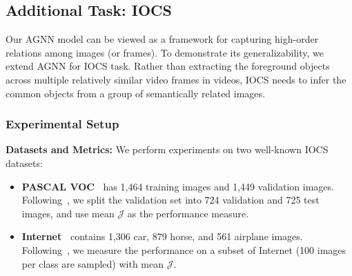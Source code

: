 \documentclass[10pt,twocolumn,letterpaper]{article}
\begin{document}
\subsection{Additional Task: IOCS}\label{sec:exIOCS}
\vspace*{-2pt}
Our AGNN model can be viewed as a framework for capturing high-order relations among images (or frames). To demonstrate its  generalizability, we extend  AGNN for IOCS task. Rather than  extracting the foreground objects across multiple relatively similar video frames in videos, IOCS needs to infer the common objects from a group of semantically related images.
\vspace*{-10pt}
\subsubsection{Experimental Setup}
\vspace*{-4pt}
\noindent\textbf{Datasets and Metrics:} We perform experiments on two well-known IOCS datasets:
\begin{itemize}[leftmargin=*]
	\setlength{\itemsep}{0pt}
	\setlength{\parsep}{-2pt}
	\setlength{\parskip}{-0pt}
	\setlength{\leftmargin}{-15pt}
\vspace{-4pt}
	\item \textbf{PASCAL VOC~\cite{pascal-voc-2012}} has 1,464 training images and 1,449 validation images. Following~\cite{DBLP:journals/corr/abs-1804-06423}, we split the validation set into 724 validation and 725 test images, and use mean $\mathcal{J}$ as the performance measure.
	
	\item \textbf{Internet~\cite{Rubinstein_2013_CVPR}}  contains 1,306 car, 879 horse, and 561 airplane images.  Following~\cite{chen2018semantic,quan2016object}, we measure the performance on a subset of Internet (100 images per class are sampled) with mean $\mathcal{J}$.
\vspace*{-2pt}
\end{itemize}
\end{document}

